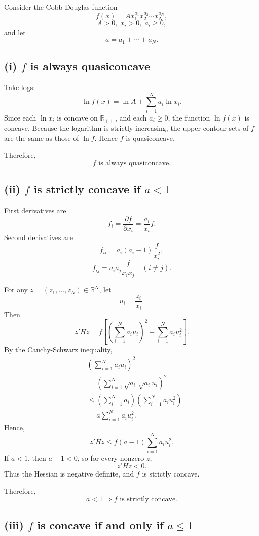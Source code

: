 Consider the Cobb-Douglas function
\[
f(x)=A x_1^{a_1}x_2^{a_2}\cdots x_N^{a_N},
\]
\[
A>0,\; x_i>0,\; a_i\ge 0,
\]
and let
\[
a=a_1+\cdots+a_N.
\]

\subsection*{(i) \(f\) is always quasiconcave}

Take logs:
\[
\ln f(x)=\ln A+\sum_{i=1}^N a_i \ln x_i.
\]
Since each \(\ln x_i\) is concave on \(\mathbb{R}_{++}\), and each \(a_i\ge 0\), the function \(\ln f(x)\) is concave. Because the logarithm is strictly increasing, the upper contour sets of \(f\) are the same as those of \(\ln f\). Hence \(f\) is quasiconcave.

Therefore,
\[
\boxed{f \text{ is always quasiconcave.}}
\]

\subsection*{(ii) \(f\) is strictly concave if \(a<1\)}

First derivatives are
\[
f_i=\frac{\partial f}{\partial x_i}=\frac{a_i}{x_i}f.
\]
Second derivatives are
\[
f_{ii}=a_i(a_i-1)\frac{f}{x_i^2},
\]
\[
f_{ij}=a_i a_j \frac{f}{x_i x_j}\quad (i\ne j).
\]

For any \(z=(z_1,\dots,z_N)\in\mathbb{R}^N\), let
\[
u_i=\frac{z_i}{x_i}.
\]
Then
\[
z'H z
=
f\left[
\left(\sum_{i=1}^N a_i u_i\right)^2
-
\sum_{i=1}^N a_i u_i^2
\right].
\]
By the Cauchy-Schwarz inequality,
\[
\begin{aligned}
&\left(\sum_{i=1}^N a_i u_i\right)^2\\
&=
\left(\sum_{i=1}^N \sqrt{a_i}\,\sqrt{a_i}u_i\right)^2\\
&\le
\left(\sum_{i=1}^N a_i\right)\left(\sum_{i=1}^N a_i u_i^2\right)\\
&=
a\sum_{i=1}^N a_i u_i^2.
\end{aligned}
\]
Hence,
\[
z'H z
\le
f(a-1)\sum_{i=1}^N a_i u_i^2.
\]
If \(a<1\), then \(a-1<0\), so for every nonzero \(z\),
\[
z'H z<0.
\]
Thus the Hessian is negative definite, and \(f\) is strictly concave.

Therefore,
\[
\boxed{a<1 \Rightarrow f \text{ is strictly concave.}}
\]

\subsection*{(iii) \(f\) is concave if and only if \(a\le 1\)}

